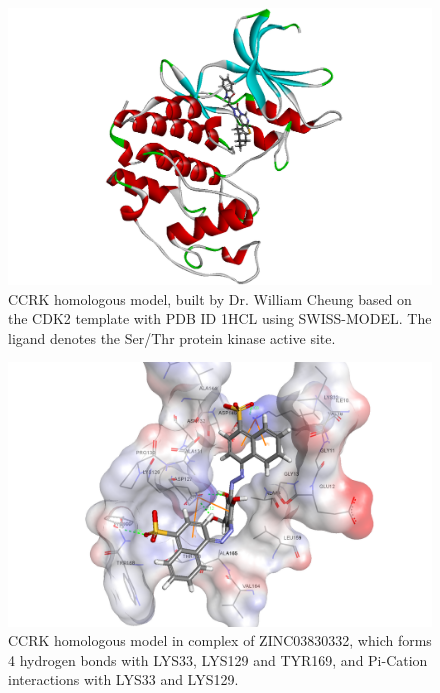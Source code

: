 \begin{figure}
\centering
\includegraphics[width=\linewidth]{Case/CCRKHomologousModel.png}
\caption{CCRK homologous model, built by Dr. William Cheung based on the CDK2 template with PDB ID 1HCL \citep{1142} using SWISS-MODEL. The ligand denotes the Ser/Thr protein kinase active site.}
\label{Case:CCRKHomologousModel}
\end{figure}

\begin{figure}
\centering
\includegraphics[width=\linewidth]{Case/1HCL-ZINC03830332.png}
\caption{CCRK homologous model in complex of ZINC03830332, which forms 4 hydrogen bonds with LYS33, LYS129 and TYR169, and Pi-Cation interactions with LYS33 and LYS129.}
\label{Case:1HCL-ZINC03830332}
\end{figure}

